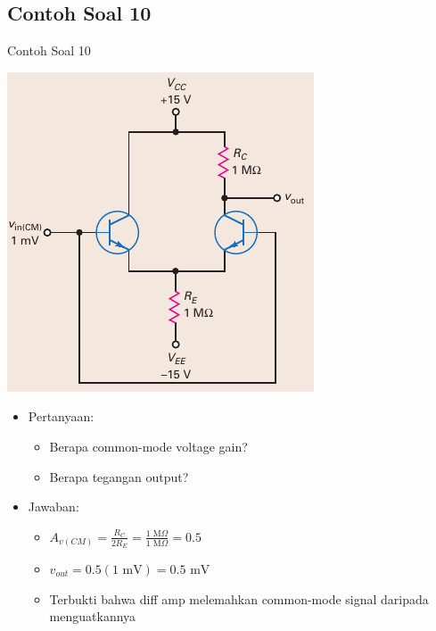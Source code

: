 \documentclass[aspectratio=169]{beamer}
\begin{document}
\subsection{Contoh Soal 10}
\begin{frame}{Contoh Soal 10}
	\begin{multicols}{2}
		\begin{center}
			\includegraphics[height=0.7\textheight]{gambar/01.fig21}
		\end{center}
		\columnbreak
		\begin{itemize}
			\item Pertanyaan:
			\begin{itemize}
				\item Berapa common-mode voltage gain?
				\item Berapa tegangan output?
			\end{itemize}
			\item Jawaban:
			\begin{itemize}
				\item $ A_{v(CM)} = \frac{R_C}{2R_E} = \frac{1 \text{ M}\Omega}{1 \text{ M}\Omega} = 0.5 $
				\item $ v_{out} = 0.5(1 \text{ mV}) = 0.5 \text{ mV} $
				\item Terbukti bahwa diff amp melemahkan common-mode signal daripada menguatkannya
			\end{itemize}
		\end{itemize}
	\end{multicols}
\end{frame}
\end{document}

